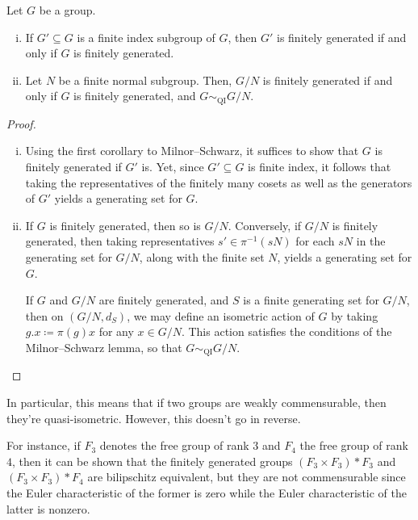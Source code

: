\documentclass[10pt]{mypackage}
\renewcommand{\coloneq}{\coloneqq}
\begin{document}
\begin{corollary}
  Let $G$ be a group.
  \begin{enumerate}[(i)]
    \item If $G'\subseteq G$ is a finite index subgroup of $G$, then $G'$ is finitely generated if and only if $G$ is finitely generated.
    \item Let $N$ be a finite normal subgroup. Then, $G/N$ is finitely generated if and only if $G$ is finitely generated, and $G\sim_{\operatorname{QI}} G/N$.
  \end{enumerate}
\end{corollary}
\begin{proof}\hfill
  \begin{enumerate}[(i)]
    \item Using the first corollary to Milnor--Schwarz, it suffices to show that $G$ is finitely generated if $G'$ is. Yet, since $G'\subseteq G$ is finite index, it follows that taking the representatives of the finitely many cosets as well as the generators of $G'$ yields a generating set for $G$.
    \item If $G$ is finitely generated, then so is $G/N$. Conversely, if $G/N$ is finitely generated, then taking representatives $s'\in \pi^{-1}\left( sN \right)$ for each $sN$ in the generating set for $G/N$, along with the finite set $N$, yields a generating set for $G$.

      If $G$ and $G/N$ are finitely generated, and $S$ is a finite generating set for $G/N$, then on $\left( G/N,d_S \right)$, we may define an isometric action of $G$ by taking $g.x\coloneq \pi(g)x$ for any $x\in G/N$. This action satisfies the conditions of the Milnor--Schwarz lemma, so that $G\sim_{\operatorname{QI}}G/N$.
  \end{enumerate}
\end{proof}
In particular, this means that if two groups are weakly commensurable, then they're quasi-isometric. However, this doesn't go in reverse.

For instance, if $F_3$ denotes the free group of rank $3$ and $F_4$ the free group of rank $4$, then it can be shown that the finitely generated groups $\left( F_3\times F_3 \right)\ast F_3$ and $\left( F_3\times F_3 \right)\ast F_4$ are bilipschitz equivalent, but they are not commensurable since the Euler characteristic of the former is zero while the Euler characteristic of the latter is nonzero.
\end{document}
